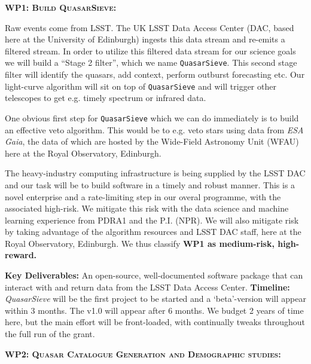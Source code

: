 \medskip \medskip
\smallskip
\smallskip
\noindent
\textbf{\textsc{WP1: Build QuasarSieve:}} 

\smallskip
\smallskip
\noindent
Raw events come from LSST. The UK LSST Data Access Center (DAC, based
here at the University of Edinburgh) ingests this data stream and
re-emits a filtered stream. In order to utilize this filtered
data stream for our science goals we will build a ``Stage 2 filter'',
which we name {\tt QuasarSieve}.  This second stage filter will
identify the quasars, add context, perform outburst forecasting etc.
Our light-curve algorithm will sit on top of {\tt QuasarSieve} and
will trigger other telescopes to get e.g. timely spectrum or infrared
data.

\smallskip
\smallskip
\noindent
One obvious first step for {\tt QuasarSieve} which we can do
immediately is to build an effective veto algorithm. This would be to
e.g. veto stars using data from {\it ESA Gaia}, the data of which are
hosted by the Wide-Field Astronomy Unit (WFAU) here at the Royal
Observatory, Edinburgh.

\smallskip
\smallskip
\noindent
The heavy-industry computing infrastructure is being supplied by the
LSST DAC and our task will be to build software in a timely and robust
manner.  This is a novel enterprise and a rate-limiting step in our
overal programme, with the associated high-risk.  We mitigate this
risk with the data science and machine learning experience from PDRA1
and the P.I. (NPR).  We will also mitigate risk by taking advantage of
the algorithm resources and LSST DAC staff, here at the Royal
Observatory, Edinburgh.  We thus classify {\bf WP1 as medium-risk,
high-reward.}  

\smallskip
\smallskip
\noindent
{\bf Key Deliverables:} An open-source, well-documented
software package that can interact with and return data from the LSST
Data Access Center. {\bf Timeline:} {\it QuasarSieve} will be the first 
project to be started and a `beta'-version will appear within 3 months. 
The v1.0 will appear after 6 months. We budget 2 years of time here, 
but the main effort will be front-loaded, with continually tweaks throughout
the full run of the grant. 


\medskip 
\medskip
\smallskip
\smallskip
\noindent
\textbf{\textsc{WP2: Quasar Catalogue Generation and Demographic studies:}}  

